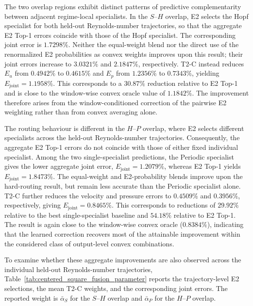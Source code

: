 The two overlap regions exhibit distinct patterns of predictive
complementarity between adjacent regime-local specialists. In the
$S$--$H$ overlap, E2 selects the Hopf specialist for both held-out
Reynolds-number trajectories, so that the aggregate E2 Top-1 errors coincide
with those of the Hopf specialist. The corresponding joint error is
$1.7298\%$. Neither the equal-weight blend nor the direct use of the
renormalized E2 probabilities as convex weights improves upon this result;
their joint errors increase to $3.0321\%$ and $2.1847\%$, respectively.
T2-C instead reduces $E_u$ from $0.4942\%$ to $0.4615\%$ and $E_p$ from
$1.2356\%$ to $0.7343\%$, yielding
$E_{\mathrm{joint}}=1.1958\%$. This corresponds to a $30.87\%$ reduction
relative to E2 Top-1 and is close to the window-wise convex oracle value of
$1.1842\%$. The improvement therefore arises from the window-conditioned
correction of the pairwise E2 weighting rather than from convex averaging
alone.

The routing behaviour is different in the $H$--$P$ overlap, where E2 selects
different specialists across the held-out Reynolds-number trajectories.
Consequently, the aggregate E2 Top-1 errors do not coincide with those of
either fixed individual specialist. Among the two single-specialist
predictions, the Periodic specialist gives the lower aggregate joint error,
$E_{\mathrm{joint}}=1.2079\%$, whereas E2 Top-1 yields
$E_{\mathrm{joint}}=1.8473\%$. The equal-weight and E2-probability blends
improve upon the hard-routing result, but remain less accurate than the
Periodic specialist alone. T2-C further reduces the velocity and pressure
errors to $0.4509\%$ and $0.3956\%$, respectively, giving
$E_{\mathrm{joint}}=0.8465\%$. This corresponds to reductions of $29.92\%$
relative to the best single-specialist baseline and $54.18\%$ relative to
E2 Top-1. The result is again close to the window-wise convex oracle
($0.8384\%$), indicating that the learned correction recovers most of the
attainable improvement within the considered class of output-level convex
combinations.

To examine whether these aggregate improvements are also observed across
the individual held-out Reynolds-number trajectories,
Table~\ref{tab:centered_square_fusion_parameter} reports the trajectory-level
E2 selections, the mean T2-C weights, and the corresponding joint errors.
The reported weight is $\bar{\alpha}_S$ for the $S$--$H$ overlap and
$\bar{\alpha}_P$ for the $H$--$P$ overlap.

